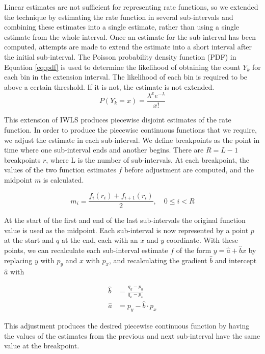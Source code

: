\documentclass[a4paper,11pt]{article}
\begin{document}
   Linear estimates are not sufficient for representing rate functions, so we
   extended the technique by estimating the rate function in several
   sub-intervals and combining these estimates into a single estimate, rather
   than using a single estimate from the whole interval. Once an estimate for
   the sub-interval has been computed, attempts are made to extend the estimate
   into a short interval after the initial sub-interval. The Poisson probability
   density function (PDF) in Equation \ref{eq:pdf} is used to determine the
   likelihood of obtaining the count $Y_k$ for each bin in the extension
   interval. The likelihood of each bin is required to be above a certain
   threshold. If it is not, the estimate is not extended.
    \begin{equation}
    \label{eq:pdf}
    P(Y_k=x)=\frac{\lambda^xe^{-\lambda}}{x!}
    \end{equation}
    
    This extension of IWLS produces piecewise disjoint estimates of the rate
    function. In order to produce the piecewise continuous functions that we
    require, we adjust the estimate in each sub-interval. We define breakpoints
    as the point in time where one sub-interval ends and another begins. There
    are $R=L-1$ breakpoints $r$, where L is the number of sub-intervals. At each
    breakpoint, the values of the two function estimates $f$ before adjustment
    are computed, and the midpoint $m$ is calculated.

    \begin{equation} 
    m_i = \frac{f_{i}(r_i) + f_{i+1}(r_i)}{2},\quad 0\leq i < R
    \end{equation}

    At the start of the first and end of the last sub-intervals the original
    function value is used as the midpoint. Each sub-interval is now represented
    by a point $p$ at the start and $q$ at the end, each with an $x$ and $y$
    coordinate. With these points, we can recalculate each sub-interval estimate
    $f$ of the form $y=\hat{a}+\hat{b}x$ by replacing $y$ with $p_y$ and $x$
    with $p_x$, and recalculating the gradient $\hat{b}$ and intercept $\hat{a}$
    with

    \begin{align} 
    \hat{b} &= \frac{q_y-p_y}{q_x-p_x}\\
    \hat{a} &= p_y - \hat{b}\cdot p_x 
    \end{align}

    This adjustment produces the desired piecewise continuous function by having
    the values of the estimates from the previous and next sub-interval have the
    same value at the breakpoint.
\end{document}
